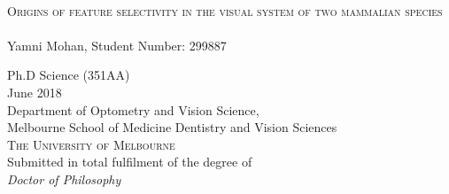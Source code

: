 \documentclass [11pt, a4paper] {book}
\begin{document}
	
	\renewcommand{\chapterbib}{}
	\renewcommand{\chapterfigures}{}
	
	
	\begin{titlepage} %
		\centering

		
	\vspace*{0.5\baselineskip} %
	\hrulefill\\ %
	
		\centering \huge {\scshape Origins of feature selectivity in the visual system of two mammalian species}\\ %
		
	\hrulefill\\
		
	\vspace*{1\baselineskip}	
	{\Large Yamni Mohan,}
	{\Large Student Number: 299887} \\
	\vspace*{2pt}

	\normalsize
	Ph.D Science (351AA) \\
	June 2018\\
	\vspace*{4\baselineskip}
	Department of Optometry and Vision Science,\\
	Melbourne School of Medicine Dentistry and Vision Sciences \\
	\vspace*{0.25\baselineskip}
	{\large \scshape The University of Melbourne} \\
	\vspace*{3\baselineskip}
	Submitted in total fulfilment of the degree of \\
	\vspace*{0.25\baselineskip}
	{\large \itshape Doctor of Philosophy} \\
	\end{titlepage}

\frontmatter
\thispagestyle{empty}




	\cleardoublepage
	

\cleardoublepage
{}





	\cleardoublepage
	\tableofcontents
\end{document}
